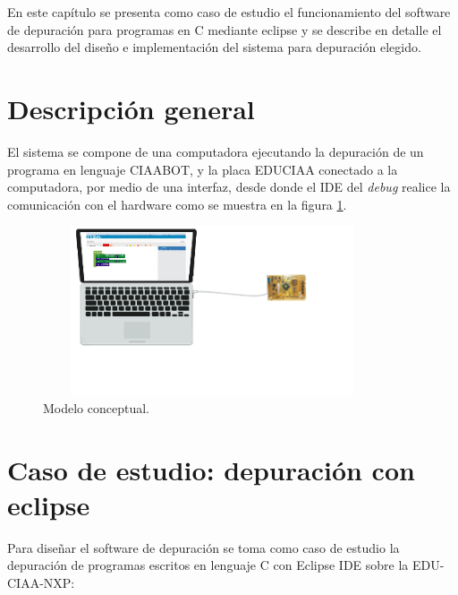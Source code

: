 En este capítulo se presenta como caso de estudio el funcionamiento del software de depuración para programas en C mediante eclipse y se describe en detalle el desarrollo del diseño e implementación del sistema para depuración elegido. 


\section{Descripción general}
\label{sec:Descripción general}

El sistema se compone de una computadora ejecutando la depuración de un programa en lenguaje CIAABOT, y la placa EDUCIAA conectado a la computadora, por medio de una interfaz, desde donde el IDE del \emph{debug} realice la comunicación con el hardware como se muestra en la figura \ref{fig:pc-bloques}.

\begin{figure}[!htbp]
    \begin{center}  %
	\includegraphics*[width=10cm,height=5cm]{./Figures/pc-bloques.png}
	\par\caption{Modelo conceptual.}\label{fig:pc-bloques}
	\end{center}
\end{figure}


\section{Caso de estudio: depuración con eclipse}
\label{sec:Alternativa de diseño}

Para diseñar el software de depuración se toma como caso de estudio la depuración de programas escritos en lenguaje C con Eclipse IDE sobre la EDU-CIAA-NXP:

